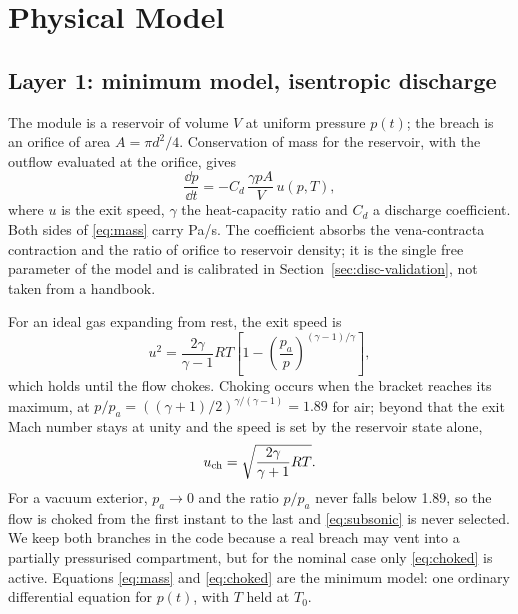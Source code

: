 \section{Physical Model}
\label{sec:model}

\subsection{Layer 1: minimum model, isentropic discharge}
\label{sec:model-basic}

The module is a reservoir of volume $V$ at uniform pressure $p(t)$; the
breach is an orifice of area $A=\pi d^2/4$. Conservation of mass for the
reservoir, with the outflow evaluated at the orifice, gives
\begin{equation}
  \frac{\dd p}{\dd t} = -C_d\,\frac{\gamma p A}{V}\,u(p,T),
  \label{eq:mass}
\end{equation}
where $u$ is the exit speed, $\gamma$ the heat-capacity ratio and $C_d$ a
discharge coefficient. Both sides of \eqref{eq:mass} carry \si{Pa/s}. The
coefficient absorbs the vena-contracta contraction and the ratio of
orifice to reservoir density; it is the single free parameter of the model
and is calibrated in Section~\ref{sec:disc-validation}, not taken from a
handbook.

For an ideal gas expanding from rest, the exit speed is
\begin{equation}
  u^2 = \frac{2\gamma}{\gamma-1}RT
  \left[1-\left(\frac{p_a}{p}\right)^{(\gamma-1)/\gamma}\right],
  \label{eq:subsonic}
\end{equation}
which holds until the flow chokes. Choking occurs when the bracket reaches
its maximum, at $p/p_a=((\gamma+1)/2)^{\gamma/(\gamma-1)}=1.89$ for air;
beyond that the exit Mach number stays at unity and the speed is set by the
reservoir state alone,
\begin{equation}
  u_{\rm ch} = \sqrt{\frac{2\gamma}{\gamma+1}RT}.
  \label{eq:choked}
\end{equation}
For a vacuum exterior, $p_a\to0$ and the ratio $p/p_a$ never falls below
1.89, so the flow is choked from the first instant to the last and
\eqref{eq:subsonic} is never selected. We keep both branches in the code
because a real breach may vent into a partially pressurised compartment,
but for the nominal case only \eqref{eq:choked} is active. Equations
\eqref{eq:mass} and \eqref{eq:choked} are the minimum model: one ordinary
differential equation for $p(t)$, with $T$ held at $T_0$.

